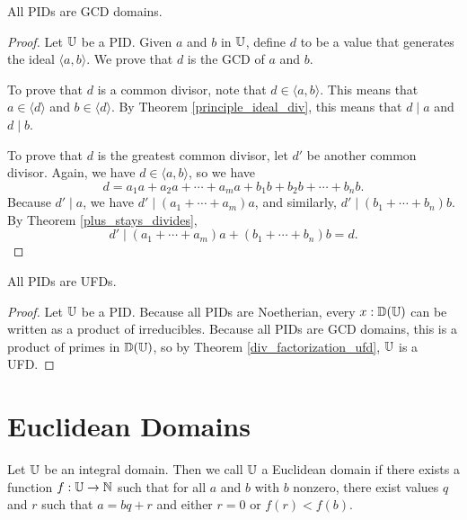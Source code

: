 \documentclass[../../math.tex]{subfiles}
\begin{document}
\begin{instance}
    All PIDs are GCD domains.
\end{instance}
\begin{proof}
    Let $\mathbb{U}$ be a PID.  Given $a$ and $b$ in $\mathbb{U}$, define $d$ to be a value that
    generates the ideal $\langle a, b \rangle$.  We prove that $d$ is the GCD of
    $a$ and $b$.

    To prove that $d$ is a common divisor, note that $d \in \langle a, b
    \rangle$.  This means that $a \in \langle d \rangle$ and $b \in \langle d
    \rangle$.  By Theorem \ref{principle_ideal_div}, this means that $d \mid a$
    and $d \mid b$.

    To prove that $d$ is the greatest common divisor, let $d'$ be another common
    divisor.  Again, we have $d \in \langle a, b \rangle$, so we have
    \[
        d = a_1 a + a_2 a + \cdots + a_m a + b_1 b + b_2 b + \cdots + b_n b.
    \]
    Because $d' \mid a$, we have $d' \mid (a_1 + \cdots + a_m)a$, and similarly,
    $d' \mid (b_1 + \cdots + b_n)b$.  By Theorem \ref{plus_stays_divides},
    \[
        d' \mid (a_1 + \cdots + a_m)a + (b_1 + \cdots + b_n)b = d.
    \]
\end{proof}

\begin{instance}
    All PIDs are UFDs.
\end{instance}
\begin{proof}
    Let $\mathbb{U}$ be a PID.  Because all PIDs are Noetherian, every $x : \mathbb{D}(\mathbb{U})$ can
    be written as a product of irreducibles.  Because all PIDs are GCD domains,
    this is a product of primes in $\mathbb{D}(\mathbb{U})$, so by Theorem
    \ref{div_factorization_ufd}, $\mathbb{U}$ is a UFD.
\end{proof}

\section{Euclidean Domains}

\begin{class}
    Let $\mathbb{U}$ be an integral domain.  Then we call $\mathbb{U}$ a Euclidean domain if
    there exists a function $f : \mathbb{U} \to \mathbb{N}$ such that for all $a$ and $b$ with
    $b$ nonzero, there exist values $q$ and $r$ such that $a = bq + r$ and
    either $r = 0$ or $f(r) < f(b)$.
\end{class}
\end{document}
